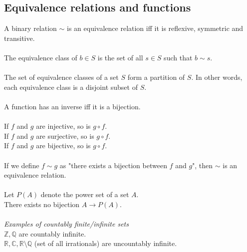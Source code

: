 \documentclass{scrartcl}
\newcommand{\R}{\mathbb{R}}
\newcommand{\Z}{\mathbb{Z}}
\newcommand{\Q}{\mathbb{Q}}
\newcommand{\C}{\mathbb{C}}
\begin{document}
\subsection{Equivalence relations and functions}
A binary relation $ \sim $ is an equivalence relation iff it is reflexive, symmetric and transitive.
\\\\
The equivalence class of $ b \in S $ is the set of all $ s \in S $ such that $ b \sim s $.
\\\\
The set of equivalence classes of a set $ S $ form a partition of $ S $. In other words, each equivalence class is a disjoint subset of $ S $.
\\\\
A function has an inverse iff it is a bijection.
\\\\
If $ f $ and $ g $ are injective, so is $ g \circ f $.
\\
If $ f $ and $ g $ are surjective, so is $ g \circ f $.
\\
If $ f $ and $ g $ are bijective, so is $ g \circ f $.
\\\\
If we define $ f \sim g $ as "there exists a bijection between $ f $ and $ g $", then $ \sim $ is an equivalence relation.
\\\\
Let $ P(A) $ denote the power set of a set $ A $.
\\
There exists no bijection $ A \to P(A) $.
\\\\
\textit{Examples of countably finite/infinite sets}
\\
$ \Z, \Q $ are countably infinite.
\\
$ \R, \C , \R \setminus \Q $ (set of all irrationals) are uncountably infinite.
\end{document}
